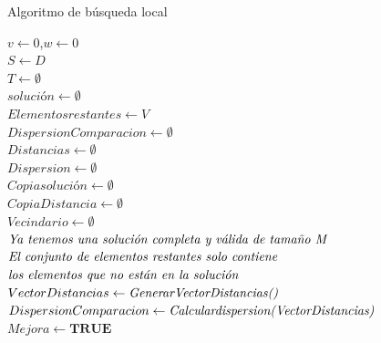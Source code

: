 \documentclass{article}
\begin{document}
\begin{algorithm}[H]
	\scriptsize
	\label{Algoritmo Busqueda Local}
	\caption{Algoritmo de búsqueda local}
	$v \leftarrow 0 $,$ w\leftarrow 0 $\\
	$ S\leftarrow D $\\
	$T \leftarrow \emptyset $\\
	$solución \leftarrow \emptyset$\\
	$Elementos restantes \leftarrow V$\\
	$Dispersion Comparacion \leftarrow \emptyset$\\
	$Distancias \leftarrow \emptyset$\\
	$Dispersion \leftarrow \emptyset$\\
	\vspace{3mm}
	$Copia solución \leftarrow \emptyset$\\
	$Copia Distancia \leftarrow \emptyset$\\
	$Vecindario \leftarrow \emptyset$\\
	\vspace{3mm}
	$\emph{Ya tenemos una solución completa y válida de tamaño M}$\\
	$\emph{El conjunto de elementos restantes solo contiene}$\\
	$\emph{los elementos que no están en la solución}$\\
	\vspace{3mm}
	$Vector Distancias \leftarrow{\emph{GenerarVectorDistancias()}}$\\
	$Dispersion Comparacion \leftarrow{\emph{Calculardispersion(VectorDistancias)}}$\\
	\vspace{3mm}
	$Mejora \leftarrow {\textbf{TRUE}}$\\


\end{algorithm}
\end{document}
